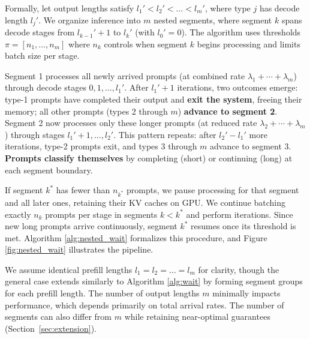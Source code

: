 Formally, let output lengths satisfy $l_1' < l_2' < \dots < l_m'$, where type $j$ has decode length $l_j'$. We organize inference into $m$ nested segments, where segment $k$ spans decode stages from $l_{k-1}' + 1$ to $l_k'$ (with $l_0' = 0$). The algorithm uses thresholds $\pi = [n_1, \dots, n_m]$ where $n_k$ controls when segment $k$ begins processing and limits batch size per stage.

Segment 1 processes all newly arrived prompts (at combined rate $\lambda_1 + \cdots + \lambda_m$) through decode stages $0, 1, \dots, l_1'$. After $l_1' + 1$ iterations, two outcomes emerge: type-1 prompts have completed their output and \textbf{exit the system}, freeing their memory; all other prompts (types 2 through $m$) \textbf{advance to segment 2}. Segment 2 now processes only these longer prompts (at reduced rate $\lambda_2 + \cdots + \lambda_m$) through stages $l_1' + 1, \dots, l_2'$. This pattern repeats: after $l_2' - l_1'$ more iterations, type-2 prompts exit, and types 3 through $m$ advance to segment 3. \textbf{Prompts classify themselves} by completing (short) or continuing (long) at each segment boundary.

If segment $k^*$ has fewer than $n_{k^*}$ prompts, we pause processing for that segment and all later ones, retaining their KV caches on GPU. We continue batching exactly $n_k$ prompts per stage in segments $k < k^*$ and perform iterations. Since new long prompts arrive continuously, segment $k^*$ resumes once its threshold is met. Algorithm \ref{alg:nested_wait} formalizes this procedure, and Figure \ref{fig:nested_wait} illustrates the pipeline.

We assume identical prefill lengths $l_1 = l_2 = \dots = l_m$ for clarity, though the general case extends similarly to Algorithm \ref{alg:wait} by forming segment groups for each prefill length. The number of output lengths \( m \) minimally impacts performance, which depends primarily on total arrival rates. The number of segments can also differ from \( m \) while retaining near-optimal guarantees (Section~\ref{sec:extension}). 

